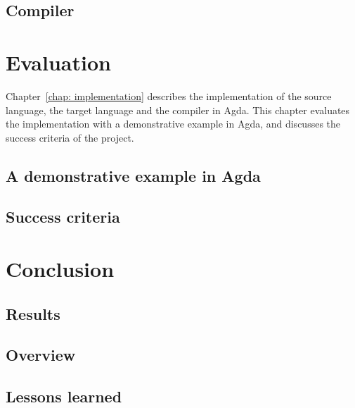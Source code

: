 \documentclass[12pt,twoside,a4paper]{report}
\theoremstyle{definition}
\theoremstyle{definition}
\theoremstyle{definition}
\theoremstyle{definition}
\newcommand{\chapref}[1]{\ref{#1}}
\begin{document}
    

    \section{Compiler}




\chapter{Evaluation}
    \minitoc
    Chapter~\chapref{chap: implementation} describes the implementation of the source language, the target language and the compiler in Agda. This chapter evaluates the implementation with a demonstrative example in Agda, and discusses the success criteria of the project.
    \section{A demonstrative example in Agda}

    \section{Success criteria}

\chapter{Conclusion}
    \minitoc
    \section{Results}

    \section{Overview}

    \section{Lessons learned}


\printbibliography

\appendix

\cleardoublepage
\let\cleardoublepage\clearpage
\pagestyle{empty}

\AtBeginShipoutNext{\AtBeginShipoutDiscard}
\end{document}
